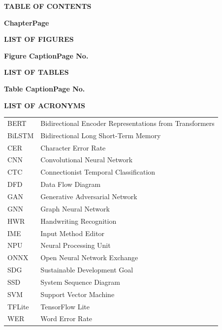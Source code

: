 \documentclass[12pt,a4paper]{report}
\newcommand{\frontheading}[1]{%
  \begin{center}\bfseries\fontsize{16}{20}\selectfont\MakeUppercase{#1}\end{center}\vspace{8pt}}
\begin{document}
\frontheading{Table of Contents}
\noindent\textbf{Chapter}\hfill\textbf{Page}\par\vspace{4pt}
\makeatletter{}\makeatother
\clearpage

\frontheading{List of Figures}
\noindent\textbf{Figure \quad Caption}\hfill\textbf{Page No.}\par\vspace{4pt}
\makeatletter{}\makeatother
\clearpage

\frontheading{List of Tables}
\noindent\textbf{Table \quad Caption}\hfill\textbf{Page No.}\par\vspace{4pt}
\makeatletter{}\makeatother
\clearpage

\frontheading{List of Acronyms}
\renewcommand{\arraystretch}{1.25}
\noindent\begin{tabular}{@{}p{1.1in}p{4.7in}@{}}
BERT & Bidirectional Encoder Representations from Transformers\\
BiLSTM & Bidirectional Long Short-Term Memory\\
CER & Character Error Rate\\
CNN & Convolutional Neural Network\\
CTC & Connectionist Temporal Classification\\
DFD & Data Flow Diagram\\
GAN & Generative Adversarial Network\\
GNN & Graph Neural Network\\
HWR & Handwriting Recognition\\
IME & Input Method Editor\\
NPU & Neural Processing Unit\\
ONNX & Open Neural Network Exchange\\
SDG & Sustainable Development Goal\\
SSD & System Sequence Diagram\\
SVM & Support Vector Machine\\
TFLite & TensorFlow Lite\\
WER & Word Error Rate\\
\end{tabular}
\renewcommand{\arraystretch}{1}
\end{document}
